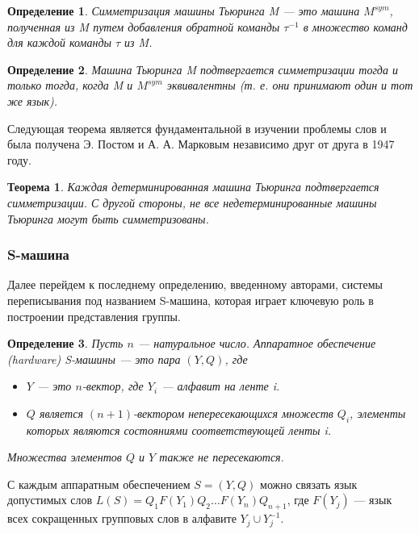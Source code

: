 \documentclass[14pt]{matmex-diploma-custom}
\newtheorem{thm}{Теорема}[subsection]
\newtheorem{defn}{Определение}[subsection]
\begin{document}
\begin{defn}
Симметризация машины Тьюринга M --- это машина $M^{sym}$, полученная из M путем добавления обратной 
команды $\tau^{-1}$ в множество команд для каждой команды $\tau$ из M.
\end{defn}

\begin{defn}
Машина Тьюринга M подтвергается симметризации тогда и только тогда, 
когда M и $M^{sym}$ эквивалентны (т. е. они принимают один и тот же язык).
\end{defn}

Следующая теорема является фундаментальной в изучении проблемы слов и была получена 
Э. Постом и А. А. Марковым независимо друг от друга в 1947 году.

\begin{thm} \label{symDetTm}
Каждая детерминированная машина Тьюринга подтвергается симметризации. 
С другой стороны, не все недетерминированные машины Тьюринга могут быть симметризованы.
\end{thm}

\subsubsection{S-машина}

Далее перейдем к последнему определению, введенному авторами, системы переписывания 
под названием S-машина, которая играет ключевую роль в построении представления группы.

\begin{defn}
Пусть $ n $ --- натуральное число.
Аппаратное обеспечение (hardware) S-машины --- это пара $ (Y, Q) $, где
\begin{itemize}
    \item $ Y $ --- это $ n $-вектор, где $ Y_i $ --- алфавит на ленте i.
    \item $ Q $ является $ (n + 1) $-вектором непересекающихся множеств $ Q_i $, элементы которых 
    являются состояниями соответствующей ленты i.
\end{itemize}
Множества элементов $ Q $ и $ Y $ также не пересекаются.
\end{defn}

С каждым аппаратным обеспечением $ S = (Y, Q) $ можно связать язык допустимых слов
$ L (S) = Q_1F(Y_1) Q_2 \dots F (Y_n) Q_{n + 1} $, где $ F (Y_j) $ --- язык
всех сокращенных групповых слов в алфавите $ Y_j \cup Y_j^{-1} $.
\end{document}
